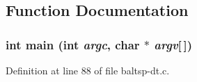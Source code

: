 \subsection{Function Documentation}
\hypertarget{bin_2baltsp-dt_8c_0ddf1224851353fc92bfbff6f499fa97}{
\subsubsection[{main}]{\setlength{\rightskip}{0pt plus 5cm}int main (int {\em argc}, \/  char $\ast$ {\em argv}\mbox{[}$\,$\mbox{]})}}
\label{bin_2baltsp-dt_8c_0ddf1224851353fc92bfbff6f499fa97}




Definition at line 88 of file baltsp-dt.c.

